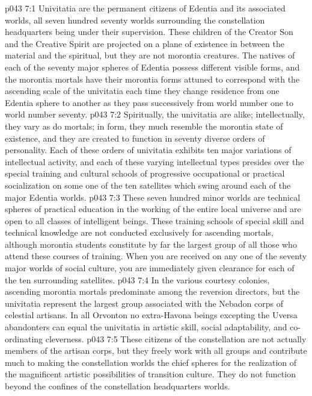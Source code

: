 \vs p043 7:1 Univitatia are the permanent citizens of Edentia and its associated worlds, all seven hundred seventy worlds surrounding the constellation headquarters being under their supervision. These children of the Creator Son and the Creative Spirit are projected on a plane of existence in between the material and the spiritual, but they are not morontia creatures. The natives of each of the seventy major spheres of Edentia possess different visible forms, and the morontia mortals have their morontia forms attuned to correspond with the ascending scale of the univitatia each time they change residence from one Edentia sphere to another as they pass successively from world number one to world number seventy.
\vs p043 7:2 Spiritually, the univitatia are alike; intellectually, they vary as do mortals; in form, they much resemble the morontia state of existence, and they are created to function in seventy diverse orders of personality. Each of these orders of univitatia exhibits ten major variations of intellectual activity, and each of these varying intellectual types presides over the special training and cultural schools of progressive occupational or practical socialization on some one of the ten satellites which swing around each of the major Edentia worlds.
\vs p043 7:3 These seven hundred minor worlds are technical spheres of practical education in the working of the entire local universe and are open to all classes of intelligent beings. These training schools of special skill and technical knowledge are not conducted exclusively for ascending mortals, although morontia students constitute by far the largest group of all those who attend these courses of training. When you are received on any one of the seventy major worlds of social culture, you are immediately given clearance for each of the ten surrounding satellites.
\vs p043 7:4 In the various courtesy colonies, ascending morontia mortals predominate among the reversion directors, but the univitatia represent the largest group associated with the Nebadon corps of celestial artisans. In all Orvonton no extra\hyp{}Havona beings excepting the Uversa abandonters can equal the univitatia in artistic skill, social adaptability, and co\hyp{}ordinating cleverness.\plusone
\vs p043 7:5 These citizens of the constellation are not actually members of the artisan corps, but they freely work with all groups and contribute much to making the constellation worlds the chief spheres for the realization of the magnificent artistic possibilities of transition culture. They do not function beyond the confines of the constellation headquarters worlds.
